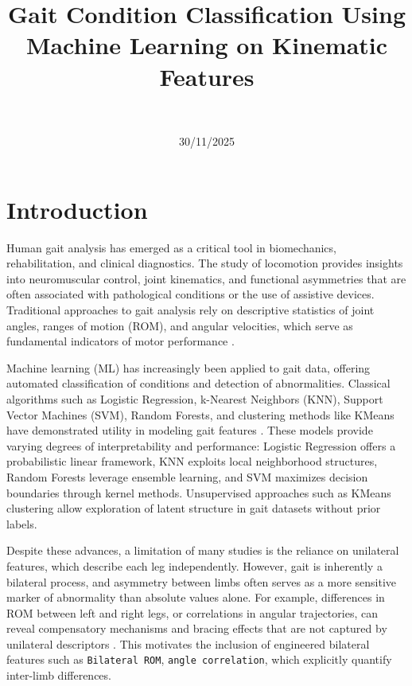 \documentclass[journal]{IEEEtran}
\title{Gait Condition Classification Using Machine Learning on Kinematic Features}
\author{
    \IEEEauthorblockN{Luis Fernando Salamanca Sánchez}\\
    \IEEEauthorblockA{
        Biomedical Engineer, Pursuing Mechatronics MSc \\
        \texttt{est.luisf.salamanca@unimilitar.edu.co}
    }
}
\date{30/11/2025}
\begin{document}
\maketitle

\section{Introduction}

Human gait analysis has emerged as a critical tool in biomechanics, rehabilitation, and clinical diagnostics. 
The study of locomotion provides insights into neuromuscular control, joint kinematics, and functional asymmetries that are often 
associated with pathological conditions or the use of assistive devices. Traditional approaches to gait analysis rely on descriptive 
statistics of joint angles, ranges of motion (ROM), and angular velocities, which serve as fundamental indicators of motor performance 
\cite{winter1991biomechanics, whittle2007gait}.

Machine learning (ML) has increasingly been applied to gait data, offering automated classification of conditions and detection of abnormalities.
Classical algorithms such as Logistic Regression, k-Nearest Neighbors (KNN), Support Vector Machines (SVM), Random Forests, and clustering methods
like KMeans have demonstrated utility in modeling gait features \cite{bishop2006pattern, murphy2012machine}. These models provide varying degrees of
interpretability and performance: Logistic Regression offers a probabilistic linear framework, KNN exploits local neighborhood structures, Random Forests 
leverage ensemble learning, and SVM maximizes decision boundaries through kernel methods. Unsupervised approaches such as KMeans clustering allow exploration 
of latent structure in gait datasets without prior labels.

Despite these advances, a limitation of many studies is the reliance on unilateral features, which describe each leg independently. However, gait is inherently a 
bilateral process, and asymmetry between limbs often serves as a more sensitive marker of abnormality than absolute values alone. For example, differences in ROM 
between left and right legs, or correlations in angular trajectories, can reveal compensatory mechanisms and bracing effects that are not captured by unilateral 
descriptors \cite{gait_asymmetry}. This motivates the inclusion of engineered bilateral features such as \texttt{Bilateral ROM}, \texttt{angle correlation}, which explicitly 
quantify inter-limb differences.
\end{document}
